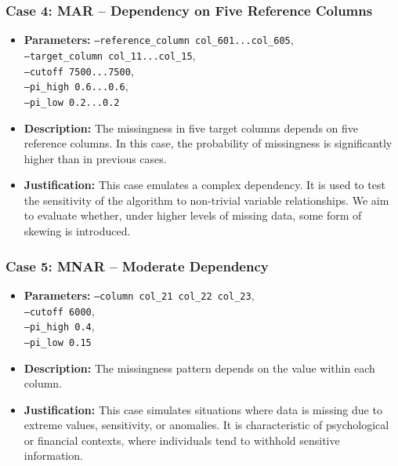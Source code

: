 \documentclass[a4paper,12pt]{article}
\begin{document}
\subsubsection{Case 4: MAR – Dependency on Five Reference Columns}
\begin{itemize}
    \item \textbf{Parameters:} \texttt{--reference\_column col\_601...col\_605},\\
    \texttt{--target\_column col\_11...col\_15},\\
    \texttt{--cutoff 7500...7500},\\
    \texttt{--pi\_high 0.6...0.6},\\
    \texttt{--pi\_low 0.2...0.2}
    
    \item \textbf{Description:} The missingness in five target columns depends on five reference columns. In this case, the probability of missingness is significantly higher than in previous cases.
    
    \item \textbf{Justification:} This case emulates a complex dependency. It is used to test the sensitivity of the algorithm to non-trivial variable relationships. We aim to evaluate whether, under higher levels of missing data, some form of skewing is introduced.
\end{itemize}

\subsubsection{Case 5: MNAR – Moderate Dependency}
\begin{itemize}
    \item \textbf{Parameters:} \texttt{--column col\_21 col\_22 col\_23},\\
    \texttt{--cutoff 6000},\\
    \texttt{--pi\_high 0.4},\\
    \texttt{--pi\_low 0.15}
    
    \item \textbf{Description:} The missingness pattern depends on the value within each column.
    
    \item \textbf{Justification:} This case simulates situations where data is missing due to extreme values, sensitivity, or anomalies. It is characteristic of psychological or financial contexts, where individuals tend to withhold sensitive information.
\end{itemize}
\end{document}
